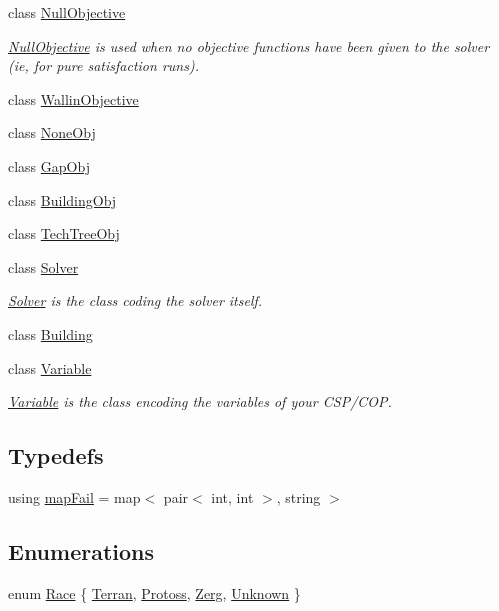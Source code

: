 \begin{DoxyCompactItemize}
class \hyperlink{classghost_1_1NullObjective}{Null\-Objective}
\begin{DoxyCompactList}\small\item\em \hyperlink{classghost_1_1NullObjective}{Null\-Objective} is used when no objective functions have been given to the solver (ie, for pure satisfaction runs). \end{DoxyCompactList}\item 
class \hyperlink{classghost_1_1WallinObjective}{Wallin\-Objective}
\item 
class \hyperlink{classghost_1_1NoneObj}{None\-Obj}
\item 
class \hyperlink{classghost_1_1GapObj}{Gap\-Obj}
\item 
class \hyperlink{classghost_1_1BuildingObj}{Building\-Obj}
\item 
class \hyperlink{classghost_1_1TechTreeObj}{Tech\-Tree\-Obj}
\item 
class \hyperlink{classghost_1_1Solver}{Solver}
\begin{DoxyCompactList}\small\item\em \hyperlink{classghost_1_1Solver}{Solver} is the class coding the solver itself. \end{DoxyCompactList}\item 
class \hyperlink{classghost_1_1Building}{Building}
\item 
class \hyperlink{classghost_1_1Variable}{Variable}
\begin{DoxyCompactList}\small\item\em \hyperlink{classghost_1_1Variable}{Variable} is the class encoding the variables of your C\-S\-P/\-C\-O\-P. \end{DoxyCompactList}\end{DoxyCompactItemize}
\subsection*{Typedefs}
\begin{DoxyCompactItemize}
\item 
using \hyperlink{namespaceghost_af44c393431f46e255b1c303cd50854b8}{map\-Fail} = map$<$ pair$<$ int, int $>$, string $>$
\end{DoxyCompactItemize}
\subsection*{Enumerations}
\begin{DoxyCompactItemize}
\item 
enum \hyperlink{namespaceghost_a8b1db75c40c6980adcf244ddccc0324b}{Race} \{ \hyperlink{namespaceghost_a8b1db75c40c6980adcf244ddccc0324ba83c1a2af1bdced3b37d96f507dea0ea4}{Terran}, 
\hyperlink{namespaceghost_a8b1db75c40c6980adcf244ddccc0324ba380e68da58f712ae9a02ded67517f6e5}{Protoss}, 
\hyperlink{namespaceghost_a8b1db75c40c6980adcf244ddccc0324ba95a952d94cc72ad754bcb37b1e16c221}{Zerg}, 
\hyperlink{namespaceghost_a8b1db75c40c6980adcf244ddccc0324ba900f1a9a96acbc80f0a573a909a21b01}{Unknown}
 \}
\end{DoxyCompactItemize}
